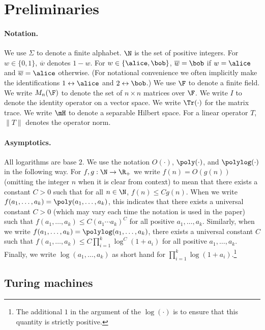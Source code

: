 \section{Preliminaries}
\label{sec:prelim}

\paragraph{Notation.}
We use $\Sigma$ to denote a finite alphabet.
$\N$ is the set of positive integers.
For $w\in\{0,1\}$, $\overline{w}$ denotes $1-w$.
For $w\in\{\alice,\bob\}$, $\overline{w}=\bob$ if $w=\alice$ and
$\overline{w}=\alice$ otherwise.
(For notational convenience we often implicitly make the identifications
$1\leftrightarrow \alice$ and $2\leftrightarrow \bob$.)
We use $\F$ to denote a finite field.
We write $M_n(\F)$ to denote the set of $n\times n$ matrices over $\F$.
We write $I$ to denote the identity operator on a vector space.
We write $\Tr(\cdot)$ for the matrix trace.
We write $\mH$ to denote a separable Hilbert space.
For a linear operator $T$, $\|T\|$ denotes the operator norm.

\paragraph{Asymptotics.}
All logarithms are base $2$.
We use the notation $O(\cdot)$, $\poly(\cdot)$, and $\polylog(\cdot)$ in the
following way.
For $f,g:\N\to\R_+$ we write $f(n)=O(g(n))$ (omitting the integer $n$ when it is
clear from context) to mean that there exists a constant $C>0$ such that for all
$n\in\N$, $f(n)\leq C g(n)$.
When we write $f(a_1,\ldots,a_k) = \poly(a_1,\ldots,a_k)$, this indicates that
there exists a universal constant $C > 0$ (which may vary each time the notation
is used in the paper) such that $f(a_1,\ldots,a_k) \leq C( a_1 \cdots a_k)^C$
for all positive $a_1,\ldots,a_k$.
Similarly, when we write $f(a_1,\ldots,a_k) = \polylog(a_1,\ldots,a_k)$, there
exists a universal constant $C$ such that $f(a_1,\ldots,a_k) \leq C\prod_{i =
  1}^k \log^C (1+ a_i)$ for all positive $a_1,\ldots,a_k$.
Finally, we write $\log(a_1,\ldots,a_k)$ as short hand for $\prod_{i = 1}^k \log
(1 + a_i)$.\footnote{The additional $1$ in the argument of the $\log(\cdot)$ is
  to ensure that this quantity is strictly positive.}

\subsection{Turing machines}
\label{sec:tms}

